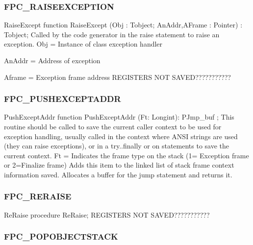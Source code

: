 \documentclass [a4paper,12pt]{article}
\begin{document}
\subsubsection{FPC{\_}RAISEEXCEPTION}
\label{subsubsec:mylabel60}

\begin{function}{RaiseExcept}
\Declaration
function RaiseExcept (Obj : Tobject; AnAddr,AFrame : Pointer) : Tobject;
\Description
Called by the code generator in the raise statement to raise an exception. 
\Parameters
Obj = Instance of class exception handler \par
AnAddr = Address of exception \par
Aframe = Exception frame address
\Notes
REGISTERS NOT SAVED???????????
\end{function}

\subsubsection{FPC{\_}PUSHEXCEPTADDR}
\label{subsubsec:mylabel61}

\begin{function}{PushExceptAddr}
\Declaration
function PushExceptAddr (Ft: Longint): PJmp{\_}buf ;
\Description
This routine should be called to save the current caller context to be used
for exception handling, usually called in the context where ANSI strings are
used (they can raise exceptions), or in a try..finally or on statements to
save the current context.
\Parameters 
Ft = Indicates the frame type on the stack (1= Exception frame or 2=Finalize
frame)
\Algorithm
Adds this item to the linked list of stack frame context information saved.
Allocates a buffer for the jump statement and returns it.
\end{function}

\subsubsection{FPC{\_}RERAISE}
\label{subsubsec:mylabel62}

\begin{procedure}{ReRaise}
\Declaration
procedure ReRaise;
\Notes
REGISTERS NOT SAVED???????????
\end{procedure}

\subsubsection{FPC{\_}POPOBJECTSTACK}
\label{subsubsec:mylabel63}
\end{document}
